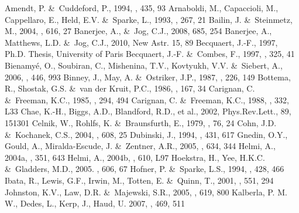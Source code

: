 \documentclass[traditabstract]{aa} %
\begin{document}

\begin{thebibliography}{}
Amendt, P. \&\ Cuddeford, P., 1994, \apj, 435, 93
Arnaboldi, M., Capaccioli, M., Cappellaro, E., Held, E.V. \&\ Sparke, L.,
1993, \aap, 267, 21
Bailin, J. \&\ Steinmetz, M., 2004, \apj, 616, 27
Banerjee, A., \&\ Jog, C.J., 2008, 685, 254
Banerjee, A., Matthews, L.D. \&\ Jog, C.J., 2010, New Astr. 15, 89
Becquaert, J.-F., 1997, Ph.D. Thesis, University of Paris
Becquaert, J.-F. \&\ Combes, F., 1997, \aap, 325, 41
Bienamy\'e, O., Soubiran, C., Mishenina, T.V., Kovtyukh, V.V. \&\ Siebert, A.,
2006, \aap, 446, 993
Binney, J., May, A. \&\ Ostriker, J.P., 1987, \mnras, 226, 149
Bottema, R., Shostak, G.S. \&\ van der Kruit, P.C., 1986, \aap, 167, 34
Carignan, C. \&\ Freeman, K.C., 1985, \apj, 294, 494
Carignan, C. \&\ Freeman, K.C., 1988, \apj, 332, L33
Chae, K.-H., Biggs, A.D., Blandford, R.D., et al., 2002, 
Phys.Rev.Lett., 89, 151301 
Celnik, W., Rohlfs, K. \&\ Braunsfurth, E., 1979, \aap, 76, 24
Cohn, J.D. \&\ Kochanek, C.S., 2004, \apj, 608, 25
Dubinski, J., 1994, \apj, 431, 617
Gnedin, O.Y., Gould, A., Miralda-Escude, J. \&\ Zentner, A.R., 2005, \apj,
634, 344
Helmi, A., 2004a, \mnras, 351, 643
Helmi, A., 2004b, \apj, 610, L97
Hoekstra, H., Yee, H.K.C. \&\ Gladders, M.D., 2005. \apj, 606, 67
Hofner, P. \&\ Sparke, L.S., 1994, \apj, 428, 466
Ibata, R., Lewis, G.F., Irwin, M., Totten, E. \&\ Quinn, T., 2001, \apj, 
551, 294
Johnston, K.V., Law, D.R. \&\ Majewski, S.R., 2005, \aj, 619, 800
Kalberla, P. M. W., Dedes, L., Kerp, J., Haud, U. 2007, \aap, 469, 511

\end{thebibliography}
\end{document}
